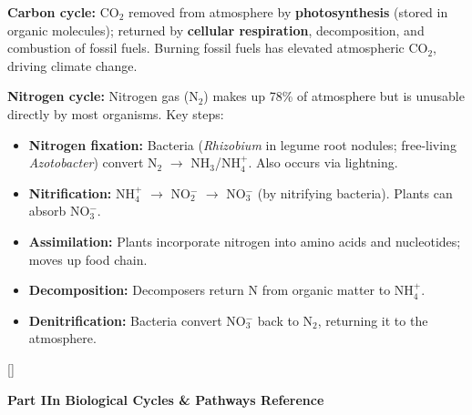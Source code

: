 \documentclass[11pt, letterpaper]{article}
\newcommand{\tealsections}{%
  \titleformat{\section}{\large\bfseries\color{sectionteal}}{}{0em}{}[\color{sectionteal}\titlerule]%
  \titleformat{\subsection}{\normalsize\bfseries\color{sectionteal!80!black}}{}{0em}{}%
}
\newcommand{\partbanner}[3]{%
  \begin{tcolorbox}[colback=#1, colframe=#2, boxrule=1.2pt, arc=4pt,
    left=8pt, right=8pt, top=6pt, bottom=6pt]
    \begin{center}{\LARGE\bfseries #3}\end{center}
  \end{tcolorbox}%
}
\begin{document}
\textbf{Carbon cycle:} CO$_2$ removed from atmosphere by \textbf{photosynthesis} (stored in
organic molecules); returned by \textbf{cellular respiration}, decomposition, and combustion
of fossil fuels. Burning fossil fuels has elevated atmospheric CO$_2$, driving climate change.

\textbf{Nitrogen cycle:} Nitrogen gas (N$_2$) makes up 78\% of atmosphere but is unusable
directly by most organisms. Key steps:
\begin{itemize}[noitemsep]
  \item \textbf{Nitrogen fixation:} Bacteria (\textit{Rhizobium} in legume root nodules;
        free-living \textit{Azotobacter}) convert N$_2$ $\to$ NH$_3$/NH$_4^+$.
        Also occurs via lightning.
  \item \textbf{Nitrification:} NH$_4^+$ $\to$ NO$_2^-$ $\to$ NO$_3^-$ (by nitrifying
        bacteria). Plants can absorb NO$_3^-$.
  \item \textbf{Assimilation:} Plants incorporate nitrogen into amino acids and nucleotides;
        moves up food chain.
  \item \textbf{Decomposition:} Decomposers return N from organic matter to NH$_4^+$.
  \item \textbf{Denitrification:} Bacteria convert NO$_3^-$ back to N$_2$, returning it
        to the atmosphere.
\end{itemize}



\newpage

\tealsections
{}
\partbanner{part5bg}{sectionteal}{Part IIn \quad Biological Cycles \& Pathways Reference}
\end{document}
